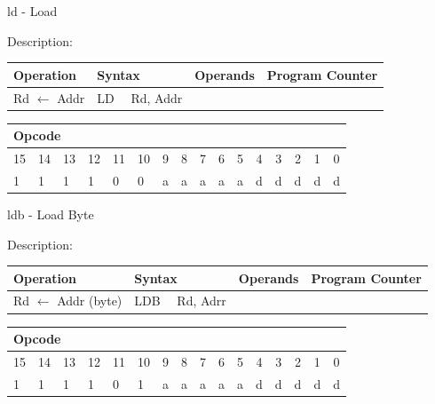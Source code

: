 \documentclass[%
	pdftex,
	a4paper,
	oneside,
	bibtotoc,%
	idxtotoc,%
	bibtotocnumbered,
	halfparskip,%
]{scrbook}
\begin{document}
\bigskip

ld - Load

Description:

\begin{tabular}{|l|l|l|l|}
\hline
Operation & Syntax & Operands & Program Counter \\ \hline
Rd $\leftarrow $ Addr & LD \ \ Rd, Addr &  &  \\ \hline
\end{tabular}

\begin{tabular}{|c|c|c|c|c|c|c|c|c|c|c|c|c|c|c|c|}
\hline
\multicolumn{6}{|l|}{Opcode} & \multicolumn{5}{|l|}{} & \multicolumn{5}{|l|}{
} \\ \hline
15 & 14 & 13 & 12 & 11 & 10 & 9 & 8 & 7 & 6 & 5 & 4 & 3 & 2 & 1 & 0 \\ \hline
\multicolumn{1}{|l|}{1} & \multicolumn{1}{|l|}{1} & \multicolumn{1}{|l|}{1}
& \multicolumn{1}{|l|}{1} & \multicolumn{1}{|l|}{0} & \multicolumn{1}{|l|}{0}
& \multicolumn{1}{|l|}{a} & \multicolumn{1}{|l|}{a} & \multicolumn{1}{|l|}{a}
& \multicolumn{1}{|l|}{a} & \multicolumn{1}{|l|}{a} & \multicolumn{1}{|l|}{d}
& \multicolumn{1}{|l|}{d} & \multicolumn{1}{|l|}{d} & \multicolumn{1}{|l|}{d}
& \multicolumn{1}{|l|}{d} \\ \hline
\end{tabular}

\bigskip

ldb - Load Byte

Description:

\begin{tabular}{|l|l|l|l|}
\hline
Operation & Syntax & Operands & Program Counter \\ \hline
Rd $\leftarrow $ Addr (byte) & LDB \ \ Rd, Adrr &  &  \\ \hline
\end{tabular}

\begin{tabular}{|c|c|c|c|c|c|c|c|c|c|c|c|c|c|c|c|}
\hline
\multicolumn{6}{|l|}{Opcode} & \multicolumn{5}{|l|}{} & \multicolumn{5}{|l|}{
} \\ \hline
15 & 14 & 13 & 12 & 11 & 10 & 9 & 8 & 7 & 6 & 5 & 4 & 3 & 2 & 1 & 0 \\ \hline
\multicolumn{1}{|l|}{1} & \multicolumn{1}{|l|}{1} & \multicolumn{1}{|l|}{1}
& \multicolumn{1}{|l|}{1} & \multicolumn{1}{|l|}{0} & \multicolumn{1}{|l|}{1}
& \multicolumn{1}{|l|}{a} & \multicolumn{1}{|l|}{a} & \multicolumn{1}{|l|}{a}
& \multicolumn{1}{|l|}{a} & \multicolumn{1}{|l|}{a} & \multicolumn{1}{|l|}{d}
& \multicolumn{1}{|l|}{d} & \multicolumn{1}{|l|}{d} & \multicolumn{1}{|l|}{d}
& \multicolumn{1}{|l|}{d} \\ \hline
\end{tabular}
\end{document}
